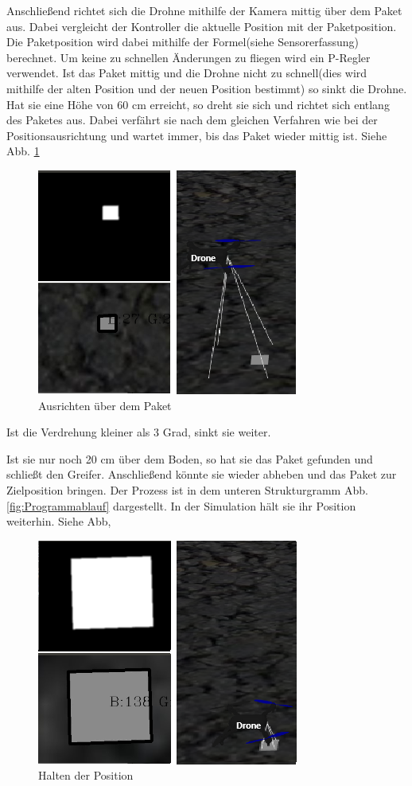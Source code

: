  Anschließend richtet sich die Drohne mithilfe der Kamera mittig über dem Paket aus. Dabei vergleicht der Kontroller die aktuelle Position mit der Paketposition. Die Paketposition wird dabei mithilfe der Formel(siehe Sensorerfassung) berechnet. Um keine zu schnellen Änderungen zu fliegen wird ein P-Regler verwendet. Ist das Paket mittig und die Drohne nicht zu schnell(dies wird mithilfe der alten Position und der neuen Position bestimmt) so sinkt die Drohne. Hat sie eine Höhe von 60 cm erreicht, so dreht sie sich und richtet sich entlang des Paketes aus. Dabei verfährt sie nach dem gleichen Verfahren wie bei der Positionsausrichtung und wartet immer, bis das Paket wieder mittig ist. Siehe Abb. \ref{fig:Drone_Simulation2}
\begin{figure}[h]
	\centering
	\includegraphics[scale=1.2]{"Grafiken/Drone_Gazebossimulatiuon2.png"}
	\caption{Ausrichten über dem Paket}
	\label{fig:Drone_Simulation2}
\end{figure}
 Ist die Verdrehung kleiner als 3 Grad, sinkt sie weiter. 
 
   Ist sie nur noch 20 cm über dem Boden, so hat sie das Paket gefunden und schließt den Greifer. Anschließend könnte sie wieder abheben und das Paket zur Zielposition bringen. Der Prozess ist in dem unteren Strukturgramm Abb. \ref{fig:Programmablauf} dargestellt. In der Simulation hält sie ihr Position weiterhin. Siehe Abb, 

\begin{figure}[h]
	\centering
	\includegraphics[scale=1.2]{"Grafiken/Drone_Gazebossimulatiuon3.png"}
	\caption{Halten der Position}
	\label{fig:Drone_Simulation3}
\end{figure}

